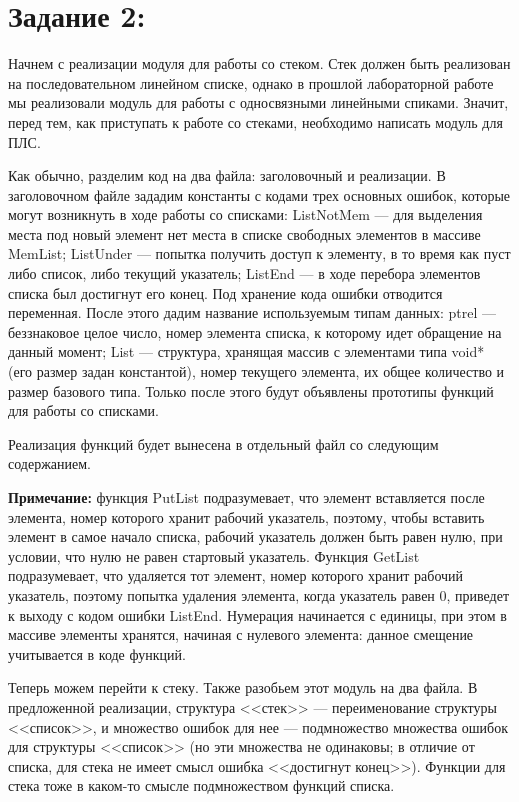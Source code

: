 \documentclass[12pt]{article}
\begin{document}
{	\section{Задание 2:}
	\label{task_2}
	
	Начнем с реализации модуля для работы со стеком. Стек должен быть реализован на последовательном линейном списке, однако в прошлой лабораторной работе мы реализовали модуль для работы с односвязными линейными спиками. Значит, перед тем, как приступать к работе со стеками, необходимо написать модуль для ПЛС. 
	
	Как обычно, разделим код на два файла: заголовочный и  реализации. В заголовочном файле зададим константы с кодами трех основных ошибок, которые могут возникнуть в ходе работы со списками: ListNotMem --- для выделения места под новый элемент нет места в списке свободных элементов в массиве MemList; ListUnder --- попытка получить доступ к элементу, в то время как пуст либо список, либо текущий указатель; ListEnd --- в ходе перебора элементов списка был достигнут его конец. Под хранение кода ошибки отводится переменная. После этого дадим название используемым типам данных: ptrel --- беззнаковое целое число, номер элемента списка, к которому идет обращение на данный момент; List --- структура, хранящая массив с элементами типа void* (его размер задан константой), номер текущего элемента, их общее количество и размер базового типа. Только после этого будут объявлены прототипы функций для работы со списками. 
	
	 
	
	Реализация функций будет вынесена в отдельный файл со следующим содержанием.
	
	{\bf Примечание:} функция PutList подразумевает, что элемент вставляется после элемента, номер которого хранит рабочий указатель, поэтому, чтобы вставить элемент в самое начало списка, рабочий указатель должен быть равен нулю, при условии, что нулю не равен стартовый указатель. Функция GetList подразумевает, что удаляется тот элемент, номер которого хранит рабочий указатель, поэтому попытка удаления элемента, когда указатель равен 0, приведет к выходу с кодом ошибки ListEnd. Нумерация начинается с единицы, при этом в массиве элементы хранятся, начиная с нулевого элемента: данное смещение учитывается в коде функций.
	
	 

	Теперь можем перейти к стеку. Также разобьем этот модуль на два файла. В предложенной реализации, структура <<стек>> ---  переименование структуры <<список>>, и множество ошибок для нее --- подмножество множества ошибок для структуры <<список>> (но эти множества не одинаковы; в отличие от списка, для стека не имеет смысл ошибка <<достигнут конец>>). Функции для стека тоже в каком-то смысле подмножеством функций списка.
	
}
\end{document}
